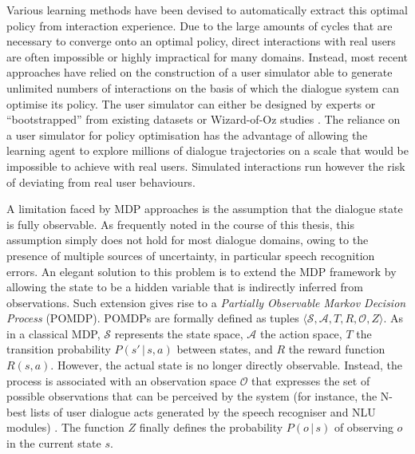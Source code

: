 Various learning methods have been devised to automatically extract this optimal policy from interaction experience. Due to the large amounts of cycles that are necessary to converge onto an optimal policy, direct interactions with real users are often impossible or highly impractical for many domains. Instead, most recent approaches have relied on the construction of a user simulator able to generate unlimited numbers of interactions on the basis of which the dialogue system can optimise its policy.  
The user simulator can either be designed by experts  or ``bootstrapped'' from existing datasets  or Wizard-of-Oz studies \citep{InTech_RL_2008_OP,FramptonL09}. The reliance on a user simulator for policy optimisation has the advantage of allowing the learning agent to explore millions of dialogue trajectories on a scale that would be impossible to achieve with real users.  Simulated interactions run however the risk of deviating from real user behaviours.

A limitation faced by MDP approaches is the assumption that the dialogue state is fully observable. As frequently noted in the course of this thesis, this assumption simply does not hold for most dialogue domains, owing to the presence of multiple sources of uncertainty, in particular speech recognition errors.  An elegant solution to this problem is to extend the MDP framework by allowing the state to be a hidden variable that is indirectly inferred from observations.  Such extension gives rise to a  \textit{Partially Observable Markov Decision Process} (POMDP).  POMDPs are formally defined as tuples $\langle \mathcal{S}, \mathcal{A}, T, R, \mathcal{O}, Z \rangle$.  As in a classical MDP, $\mathcal{S}$ represents the state space, $\mathcal{A}$ the action space, $T$ the transition probability $P(s'\, | \, s,a)$ between states, and $R$ the reward function $R(s,a)$.  However, the actual state is no longer directly observable.  Instead, the process is associated with an observation space $\mathcal{O}$ that expresses the set of possible observations that can be perceived by the system (for instance, the N-best lists of user dialogue acts generated by the speech recogniser and NLU modules) . The function $Z$ finally defines the probability $P(o\, | \, s)$ of observing $o$ in the current state $s$.  


